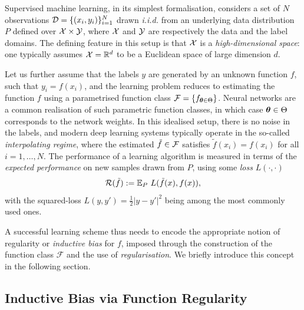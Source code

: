 
Supervised machine learning, in its simplest formalisation, considers a set of $N$ observations ${\mathcal{D}}=\{(x_i, y_i)\}_{i=1}^{ N}$ drawn \emph{i.i.d.} 
from an underlying data distribution $P$ defined over ${\mathcal{X}} \times {\mathcal{Y}}$, where ${\mathcal{X}}$ and ${\mathcal{Y}}$ are respectively the data and the label domains. The defining feature in this setup is that ${\mathcal{X}}$ is a {\em high-dimensional space}: one typically assumes ${\mathcal{X}}= \mathbb{R}^d$ to be a  Euclidean space  of large dimension $d$.


Let us further assume that the labels $y$ are generated by an unknown function $f$, such that $y_i = f(x_i)$, 
and the learning problem reduces to estimating the function $f$ using a parametrised function class ${\mathcal{F}}=\{ f_{\boldsymbol{\theta} \in \Theta}\}$. Neural networks are a common realisation of such parametric function classes, in which case $\boldsymbol{\theta} \in \Theta$ corresponds to the network weights. 
In this idealised setup, there is no noise in the labels, and modern deep learning systems typically operate in the so-called \emph{interpolating regime}, where the estimated $\tilde{f} \in {\mathcal{F}}$ satisfies $\tilde{f}(x_i) = f(x_i)$ for all $i=1,\hdots, N$.  
The performance of a learning algorithm is measured in terms of the \emph{expected performance}  on new samples drawn from ${P}$, using some {\em loss} $L(\cdot,\cdot)$ 
$${\mathcal{R}}(\tilde{f}):= \mathbb{E}_{P}\,\, L(\tilde{f}(x), f(x)),$$
%
with the squared-loss $L(y,y')=\frac{1}{2}|y-y'|^2$ being among the most commonly used ones.  


A successful learning scheme thus needs to encode the appropriate notion of regularity or  \emph{inductive bias} for $f$, imposed through the construction of the function class $\mathcal{F}$ and the use of {\em regularisation}. We briefly introduce this concept in the following section. %


\subsection{Inductive Bias via Function Regularity}
\label{sec:inductive}


